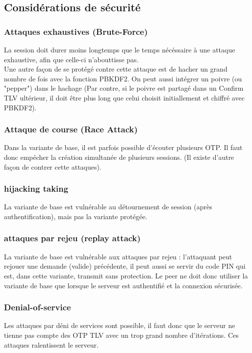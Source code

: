 \documentclass{article}
\begin{document}
\subsection{Considérations de sécurité}

\subsubsection{Attaques exhaustives (Brute-Force)}
    La session doit durer moins longtemps que le temps nécéssaire à une attaque exhaustive, afin que celle-ci n'abouttisse pas.\\
Une autre façon de se protégé contre cette attaque est de hacher un grand nombre de fois avec la fonction PBKDF2.
On peut aussi intégrer un poivre (ou "pepper") dans le hachage (Par contre, si le poivre est partagé dans un Confirm TLV ultérieur, il doit être plus long que celui choisit initiallement et chiffré avec PBKDF2).

\subsubsection{Attaque de course (Race Attack)}
Dans la variante de base, il est parfois possible d'écouter plusieurs OTP.
Il faut donc empécher la création simultanée de plusieurs sessions. (Il existe d'autre façon de contrer cette attaques).

\subsubsection{hijacking taking}
La variante de base est vulnérable au détournement de session (après authentification), mais pas la variante protégée.

\subsubsection{attaques par rejeu (replay attack)}
La variante de base est vulnérable aux attaques par rejeu : l'attaquant peut rejouer une demande (valide) précédente, il peut aussi se servir du code PIN qui est, dans cette variante, transmit sans protection.
Le peer ne doit donc utiliser la variante de base que lorsque le serveur est authentifié et la connexion sécurisée.

\subsubsection{Denial-of-service}
 Les attaques par déni de services sont possible, il faut donc que le serveur ne tienne pas compte des OTP TLV avec un trop grand nombre d'itérations.
Ces attaques ralentissent le serveur.
\end{document}

